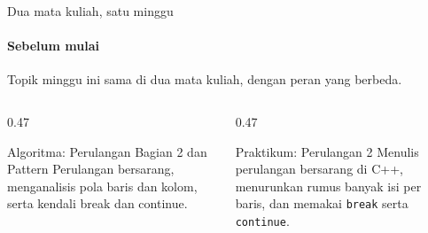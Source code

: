 \documentclass[t]{beamer}
\begin{document}

\begin{frame}{Dua mata kuliah, satu minggu}
\framesubtitle{Sebelum mulai}
Topik minggu ini sama di dua mata kuliah, dengan peran yang berbeda.
\vspace{10pt}

\begin{columns}[T]
\begin{column}{0.47\textwidth}
\begin{Blok}{Algoritma: Perulangan Bagian 2 dan Pattern}
Perulangan bersarang, menganalisis pola baris dan kolom, serta kendali break dan continue.
\end{Blok}
\end{column}
\begin{column}{0.47\textwidth}
\begin{BlokGelap}{Praktikum: Perulangan 2}
Menulis perulangan bersarang di C++, menurunkan rumus banyak isi per baris, dan memakai \texttt{break} serta \texttt{continue}.
\end{BlokGelap}
\end{column}
\end{columns}
\end{frame}
\end{document}
